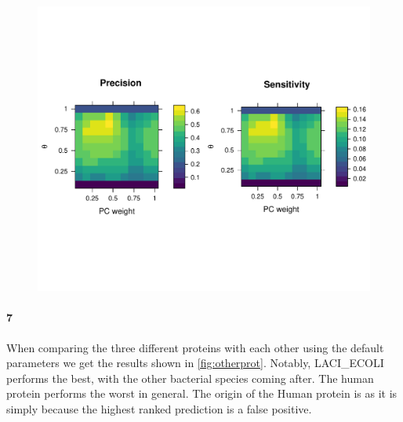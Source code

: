 \documentclass[11pt]{article}\usepackage[]{graphicx}\usepackage[]{color}
\makeatletter
\def\maxwidth{ %
  \ifdim\Gin@nat@width>\linewidth
    \linewidth
  \else
    \Gin@nat@width
  \fi
}
\theoremstyle{plain}
\makeatother
\begin{document}
\begin{multicols*}{2}
\begin{Schunk}
\begin{figure}[H]

{\centering \includegraphics[width=\maxwidth]{figure/twocolumn-sensandso-1} 

}

\caption[ ]{ }\label{fig:sensandso}
\end{figure}
\end{Schunk}
	
	\paragraph{7}
	When comparing the three different proteins with each other using the default parameters we get the results shown in \cref{fig:otherprot}. Notably, LACI\_ECOLI performs the best, with the other bacterial species coming after. The human protein performs the worst in general. The origin of the Human protein is as it is simply because the highest ranked prediction is a false positive. 
\begin{Schunk}
\begin{figure}[H]


\end{figure}
\end{Schunk}
\end{multicols*}
\end{document}
